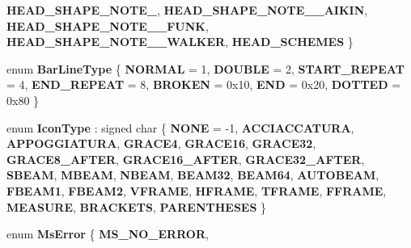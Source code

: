 \begin{DoxyCompactItemize}
{\bfseries H\+E\+A\+D\+\_\+\+S\+H\+A\+P\+E\+\_\+\+N\+O\+T\+E\+\_}, 
{\bfseries H\+E\+A\+D\+\_\+\+S\+H\+A\+P\+E\+\_\+\+N\+O\+T\+E\+\_\+\_\+\+A\+I\+K\+IN}, 
{\bfseries H\+E\+A\+D\+\_\+\+S\+H\+A\+P\+E\+\_\+\+N\+O\+T\+E\+\_\+\_\+\+F\+U\+NK}, 
\newline
{\bfseries H\+E\+A\+D\+\_\+\+S\+H\+A\+P\+E\+\_\+\+N\+O\+T\+E\+\_\+\_\+\+W\+A\+L\+K\+ER}, 
{\bfseries H\+E\+A\+D\+\_\+\+S\+C\+H\+E\+M\+ES}
 \}
\item 
\mbox{\label{namespace_ms_af1c6d5c887f8bc4c394e7050f483914f}} 
enum {\bfseries Bar\+Line\+Type} \{ \newline
{\bfseries N\+O\+R\+M\+AL} = 1, 
{\bfseries D\+O\+U\+B\+LE} = 2, 
{\bfseries S\+T\+A\+R\+T\+\_\+\+R\+E\+P\+E\+AT} = 4, 
{\bfseries E\+N\+D\+\_\+\+R\+E\+P\+E\+AT} = 8, 
\newline
{\bfseries B\+R\+O\+K\+EN} = 0x10, 
{\bfseries E\+ND} = 0x20, 
{\bfseries D\+O\+T\+T\+ED} = 0x80
 \}
\item 
\mbox{\label{namespace_ms_af5e4ec7a183fe9ea39bfb81888efbde2}} 
enum {\bfseries Icon\+Type} \+: signed char \{ \newline
{\bfseries N\+O\+NE} = -\/1, 
{\bfseries A\+C\+C\+I\+A\+C\+C\+A\+T\+U\+RA}, 
{\bfseries A\+P\+P\+O\+G\+G\+I\+A\+T\+U\+RA}, 
{\bfseries G\+R\+A\+C\+E4}, 
\newline
{\bfseries G\+R\+A\+C\+E16}, 
{\bfseries G\+R\+A\+C\+E32}, 
{\bfseries G\+R\+A\+C\+E8\+\_\+\+A\+F\+T\+ER}, 
{\bfseries G\+R\+A\+C\+E16\+\_\+\+A\+F\+T\+ER}, 
\newline
{\bfseries G\+R\+A\+C\+E32\+\_\+\+A\+F\+T\+ER}, 
{\bfseries S\+B\+E\+AM}, 
{\bfseries M\+B\+E\+AM}, 
{\bfseries N\+B\+E\+AM}, 
\newline
{\bfseries B\+E\+A\+M32}, 
{\bfseries B\+E\+A\+M64}, 
{\bfseries A\+U\+T\+O\+B\+E\+AM}, 
{\bfseries F\+B\+E\+A\+M1}, 
\newline
{\bfseries F\+B\+E\+A\+M2}, 
{\bfseries V\+F\+R\+A\+ME}, 
{\bfseries H\+F\+R\+A\+ME}, 
{\bfseries T\+F\+R\+A\+ME}, 
\newline
{\bfseries F\+F\+R\+A\+ME}, 
{\bfseries M\+E\+A\+S\+U\+RE}, 
{\bfseries B\+R\+A\+C\+K\+E\+TS}, 
{\bfseries P\+A\+R\+E\+N\+T\+H\+E\+S\+ES}
 \}
\item 
\mbox{\label{namespace_ms_ad1b1585b0038ede29126efd627daae91}} 
enum {\bfseries Ms\+Error} \{ \newline
{\bfseries M\+S\+\_\+\+N\+O\+\_\+\+E\+R\+R\+OR}, 

\end{DoxyCompactItemize}
